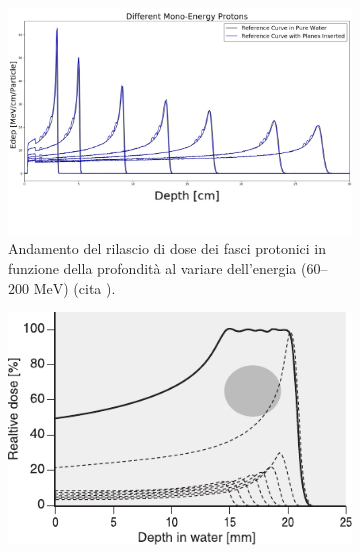 \documentclass[12pt,a4paper,twoside]{report}
\begin{document}
		\begin{figure}[H]
		\centering
		\begin{subfigure}[t]{0.49\textwidth}
			\centering
			\includegraphics[width=\textwidth, scale=0.50]{bragg_peak_energies.jpg}
			\caption{Andamento del rilascio di dose dei fasci protonici in funzione della profondità al variare dell'energia ($60$--$200\mbox{ MeV}$) (cita
				).}
			\label{fig:bragg_peak_energies}
		\end{subfigure}
		\hfill
		\begin{subfigure}[t]{0.49\textwidth}
			\centering
			\includegraphics[width=\textwidth, scale=0.50]{sobp.pdf}

\end{subfigure}
\end{figure}
\end{document}
